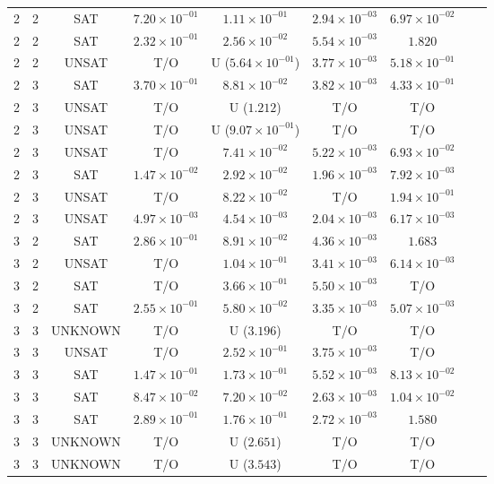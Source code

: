 \begin{table}
\begin{tabular}{ccccccccc}
2 & 2 & SAT & $7.20 \times 10^{-01}$ & $1.11 \times 10^{-01}$ & $2.94 \times 10^{-03}$ & $6.97 \times 10^{-02}$ \\
2 & 2 & SAT & $2.32 \times 10^{-01}$ & $2.56 \times 10^{-02}$ & $5.54 \times 10^{-03}$ & $1.820$ \\
2 & 2 & UNSAT & T/O & U ($5.64 \times 10^{-01}$) & $3.77 \times 10^{-03}$ & $5.18 \times 10^{-01}$ \\
2 & 3 & SAT & $3.70 \times 10^{-01}$ & $8.81 \times 10^{-02}$ & $3.82 \times 10^{-03}$ & $4.33 \times 10^{-01}$ \\
2 & 3 & UNSAT & T/O & U ($1.212$) & T/O & T/O \\
2 & 3 & UNSAT & T/O & U ($9.07 \times 10^{-01}$) & T/O & T/O \\
2 & 3 & UNSAT & T/O & $7.41 \times 10^{-02}$ & $5.22 \times 10^{-03}$ & $6.93 \times 10^{-02}$ \\
2 & 3 & SAT & $1.47 \times 10^{-02}$ & $2.92 \times 10^{-02}$ & $1.96 \times 10^{-03}$ & $7.92 \times 10^{-03}$ \\
2 & 3 & UNSAT & T/O & $8.22 \times 10^{-02}$ & T/O & $1.94 \times 10^{-01}$ \\
2 & 3 & UNSAT & $4.97 \times 10^{-03}$ & $4.54 \times 10^{-03}$ & $2.04 \times 10^{-03}$ & $6.17 \times 10^{-03}$ \\
3 & 2 & SAT & $2.86 \times 10^{-01}$ & $8.91 \times 10^{-02}$ & $4.36 \times 10^{-03}$ & $1.683$ \\
3 & 2 & UNSAT & T/O & $1.04 \times 10^{-01}$ & $3.41 \times 10^{-03}$ & $6.14 \times 10^{-03}$ \\
3 & 2 & SAT & T/O & $3.66 \times 10^{-01}$ & $5.50 \times 10^{-03}$ & T/O \\
3 & 2 & SAT & $2.55 \times 10^{-01}$ & $5.80 \times 10^{-02}$ & $3.35 \times 10^{-03}$ & $5.07 \times 10^{-03}$ \\
3 & 3 & UNKNOWN & T/O & U ($3.196$) & T/O & T/O \\
3 & 3 & UNSAT & T/O & $2.52 \times 10^{-01}$ & $3.75 \times 10^{-03}$ & T/O \\
3 & 3 & SAT & $1.47 \times 10^{-01}$ & $1.73 \times 10^{-01}$ & $5.52 \times 10^{-03}$ & $8.13 \times 10^{-02}$ \\
3 & 3 & SAT & $8.47 \times 10^{-02}$ & $7.20 \times 10^{-02}$ & $2.63 \times 10^{-03}$ & $1.04 \times 10^{-02}$ \\
3 & 3 & SAT & $2.89 \times 10^{-01}$ & $1.76 \times 10^{-01}$ & $2.72 \times 10^{-03}$ & $1.580$ \\
3 & 3 & UNKNOWN & T/O & U ($2.651$) & T/O & T/O \\
3 & 3 & UNKNOWN & T/O & U ($3.543$) & T/O & T/O \\
  \bottomrule
\end{tabular}
\end{table}

